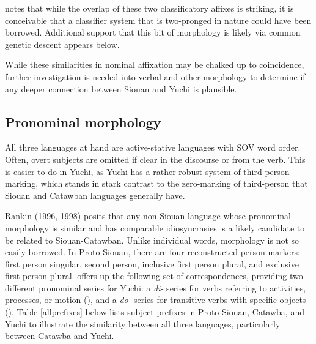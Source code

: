 \documentclass[output=paper]{LSP/langsci}
\begin{document}
{\citet{Rankin1998} notes that while the overlap of these two classificatory affixes is striking, it is conceivable that a classifier system that is two-pronged in nature could have been borrowed. Additional support that this bit of morphology is likely via common genetic descent appears below.

While these similarities in nominal affixation may be chalked up to coincidence, further investigation is needed into verbal and other morphology to determine if any deeper connection between Siouan and Yuchi is plausible.

\subsection{Pronominal morphology}

All three languages at hand are active-stative languages with SOV word order. Often, overt subjects are omitted if clear in the discourse or from the verb. This is easier to do in Yuchi, as Yuchi has a rather robust system of third-person marking, which stands in stark contrast to the zero-marking of third-person that Siouan and Catawban languages generally have.

Rankin (1996, 1998) posits that any non-Siouan language whose pronominal morphology is similar and has comparable idiosyncrasies is a likely candidate to be related to Siouan-Catawban. Unlike individual words, morphology is not so easily borrowed. In Proto-Siouan, there are four reconstructed person markers: first person singular, second person, inclusive first person plural, and exclusive first person plural. \citet{Rankin1998} offers up the following set of correspondences, providing two different pronominal series for Yuchi: a \emph{di-} series for verbs referring to activities, processes, or motion (\citealt[130]{Linn2000}), and a \emph{do}- series for transitive verbs with specific objects (\citealt[178]{Linn2000}). Table \ref{allprefixes} below lists subject prefixes in Proto-Siouan, Catawba, and Yuchi to illustrate the similarity between all three languages, particularly between Catawba and Yuchi.


}
\end{document}
